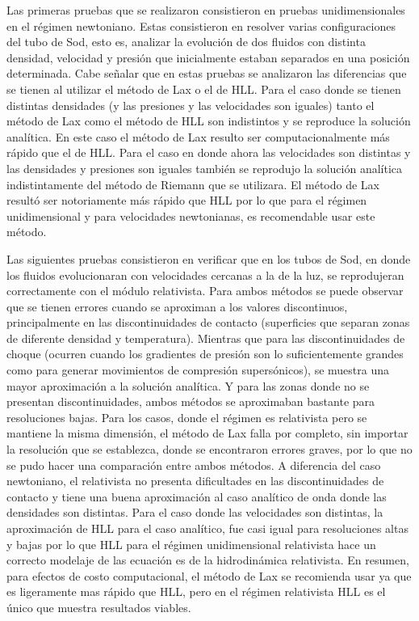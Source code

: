 \documentclass[12pt,a4paper]{book}
\begin{document}
Las primeras pruebas que se realizaron consistieron en pruebas unidimensionales en el régimen newtoniano. Estas consistieron en resolver varias configuraciones del tubo de Sod, esto es, 
analizar la evolución de dos fluidos con distinta densidad, velocidad y presión que inicialmente estaban separados en una posición determinada. Cabe señalar que en estas pruebas se analizaron las diferencias 
que se tienen al utilizar el método de Lax o el de HLL. Para el caso donde se tienen distintas densidades (y las presiones y las velocidades son iguales) tanto el método de Lax como el método de HLL son indistintos 
y se reproduce la solución analítica. En este caso el método de Lax resulto ser computacionalmente más rápido que el de HLL. Para el caso en donde ahora las velocidades son distintas y las densidades y presiones son 
iguales también se reprodujo la solución analítica indistintamente del método de Riemann que se utilizara. El método de Lax resultó ser notoriamente más rápido que HLL por lo que para el régimen unidimensional y para 
velocidades newtonianas, es recomendable usar este método.


Las siguientes pruebas consistieron en verificar que en los tubos de Sod, en donde los fluidos evolucionaran con velocidades cercanas a la de la luz, se reprodujeran correctamente con el 
módulo relativista. 
{\color{blue}
Para ambos métodos se puede observar que se tienen errores cuando se aproximan a los valores discontinuos, principalmente en las discontinuidades de contacto (superficies que separan 
zonas de diferente densidad y temperatura). Mientras que para las discontinuidades de choque (ocurren cuando los gradientes de presión son lo suficientemente grandes como para generar movimientos de compresión supersónicos),  %
se muestra una mayor aproximación a la solución analítica. Y para las zonas donde no se presentan discontinuidades, ambos métodos se aproximaban bastante para resoluciones bajas.} Para los casos, donde el régimen es relativista 
pero se mantiene la misma dimensión, el método de Lax falla 
por completo, sin importar la resolución que se establezca, donde se encontraron errores graves, por lo que no se pudo hacer una comparación entre ambos métodos. A diferencia del caso newtoniano, 
el relativista no presenta dificultades en las discontinuidades de contacto y tiene una buena aproximación al caso analítico de onda donde las densidades son distintas. Para el caso donde las 
velocidades son distintas, la aproximación de HLL para el caso analítico, fue casi igual para resoluciones altas y bajas por lo que  HLL para el régimen unidimensional relativista  
hace un correcto modelaje de las ecuación  es de la hidrodinámica relativista. En resumen, para efectos de costo computacional, el método de Lax se recomienda usar ya que es ligeramente mas rápido 
que HLL, pero en el régimen relativista HLL es el único que muestra resultados viables.
\end{document}
